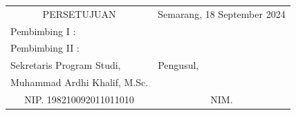 \documentclass[12pt]{article}
\def\sekprodi{Muhammad Ardhi Khalif, M.Sc.}
\def\NIP{NIP. 198210092011011010}
\def\mahasiswa{}
\def\NIM{NIM. }
\def\tanggal{18 September 2024}
\begin{document}
\vspace{1cm}
\noindent
\begin{tabular}{|l|l|}
\hline
\multicolumn{1}{|c|}{PERSETUJUAN} & \multicolumn{1}{|c|}{Semarang, \tanggal}\\
\multicolumn{1}{|l|}{Pembimbing I  :} & \multicolumn{1}{|l|}{}\\
\multicolumn{1}{|l|}{Pembimbing II :} & \multicolumn{1}{|l|}{}\\
\multicolumn{1}{|m{0.5\textwidth}|}{\centering Sekretaris Program Studi,} & \multicolumn{1}{|m{0.45\textwidth}|}{\centering Pengusul,}\\[3cm]
\multicolumn{1}{|c|}{\sekprodi } & \multicolumn{1}{|c|}{\mahasiswa}\\ %
\multicolumn{1}{|c|}{\NIP }   & \multicolumn{1}{|c|}{\NIM}\\ %
\hline
\end{tabular}
\end{document}
